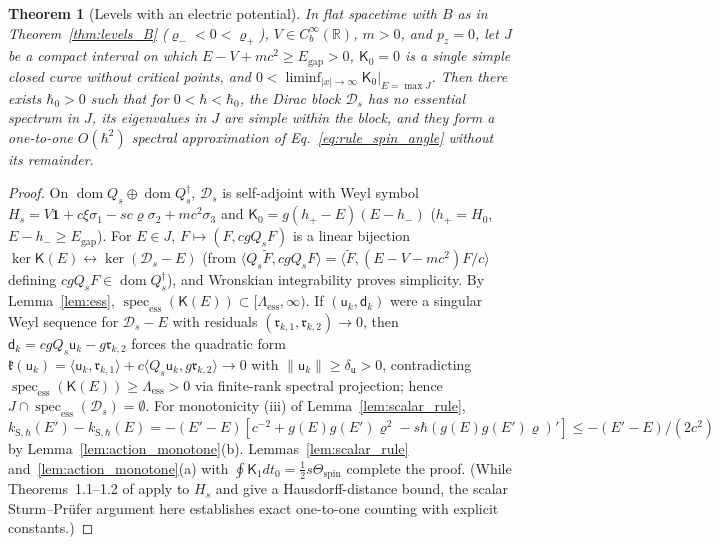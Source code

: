 \documentclass[aps,prd,onecolumn,tightenlines,nofootinbib,notitlepage,10pt,floatfix]{revtex4-2}
\theoremstyle{indentedtheorem}
\newtheorem{theorem}{Theorem}
\begin{document}
\begin{theorem}[Levels with an electric potential]\label{thm:levels_V}
In flat spacetime with $B$ as in Theorem~\ref{thm:levels_B} ($\varrho_-<0<\varrho_+$), $V\in C_b^\infty(\mathbb{R})$, $m>0$, and $p_z=0$, let $J$ be a compact interval on which $E-V+mc^2\ge E_\text{gap}>0$, $\mathsf{K}_0=0$ is a single simple closed curve without critical points, and $0<\liminf_{|x|\to\infty}\mathsf{K}_0|_{E=\max J}$. Then there exists $\hbar_0>0$ such that for $0<\hbar<\hbar_0$, the Dirac block $\mathcal{D}_s$ has no essential spectrum in $J$, its eigenvalues in $J$ are simple within the block, and they form a one-to-one $O(\hbar^2)$ spectral approximation of Eq.~\eqref{eq:rule_spin_angle} without its remainder.
\end{theorem}
\begin{proof}
On $\operatorname{dom}Q_s\oplus\operatorname{dom}Q_s^\dagger$, $\mathcal{D}_s$ is self-adjoint with Weyl symbol $H_s=V\mathbf{1}+c\xi\sigma_1-sc\varrho\sigma_2+mc^2\sigma_3$ and $\mathsf{K}_0=g(h_+-E)(E-h_-)$ ($h_+=H_0$, $E-h_-\ge E_\text{gap}$). For $E\in J$, $F\mapsto(F,cgQ_s F)$ is a linear bijection $\ker\mathsf{K}(E)\leftrightarrow\ker(\mathcal{D}_s-E)$ (from $\langle Q_s\tilde{F},cgQ_s F\rangle=\langle\tilde{F},(E-V-mc^2)F/c\rangle$ defining $cgQ_s F\in\operatorname{dom}Q_s^\dagger$), and Wronskian integrability proves simplicity. By Lemma~\ref{lem:ess}, $\operatorname{spec}_\text{ess}(\mathsf{K}(E))\subset[\Lambda_\text{ess},\infty)$. If $(\mathsf{u}_k,\mathsf{d}_k)$ were a singular Weyl sequence for $\mathcal{D}_s-E$ with residuals $(\mathfrak{r}_{k,1},\mathfrak{r}_{k,2})\to 0$, then $\mathsf{d}_k=cgQ_s\mathsf{u}_k-g\mathfrak{r}_{k,2}$ forces the quadratic form $\mathfrak{k}(\mathsf{u}_k)=\langle\mathsf{u}_k,\mathfrak{r}_{k,1}\rangle+c\langle Q_s\mathsf{u}_k,g\mathfrak{r}_{k,2}\rangle\to 0$ with $\|\mathsf{u}_k\|\ge\delta_\mathsf{u}>0$, contradicting $\operatorname{spec}_\text{ess}(\mathsf{K}(E))\ge\Lambda_\text{ess}>0$ via finite-rank spectral projection; hence $J\cap\operatorname{spec}_\text{ess}(\mathcal{D}_s)=\emptyset$. For monotonicity (iii) of Lemma~\ref{lem:scalar_rule}, $k_{\text{S},\hbar}(E')-k_{\text{S},\hbar}(E)=-(E'-E)[c^{-2}+g(E)g(E')\varrho^2-s\hbar(g(E)g(E')\varrho)']\le -(E'-E)/(2c^2)$ by Lemma~\ref{lem:action_monotone}(b). Lemmas~\ref{lem:scalar_rule} and~\ref{lem:action_monotone}(a) with $\oint\mathsf{K}_1 dt_0=\tfrac{1}{2}s\Theta_\text{spin}$ complete the proof. (While Theorems~1.1--1.2 of \citet{BeckerFujiieWittsten2025Bohr} apply to $H_s$ and give a Hausdorff-distance bound, the scalar Sturm--Pr\"ufer argument here establishes exact one-to-one counting with explicit constants.)
\end{proof}
\end{document}
